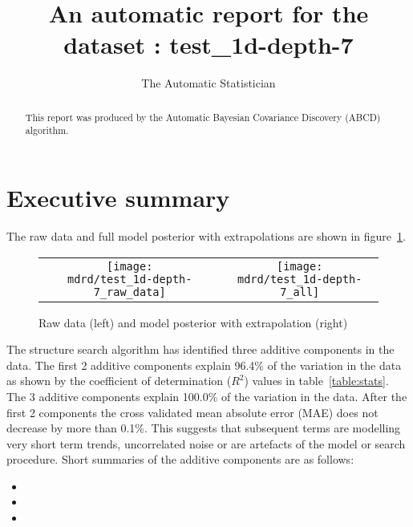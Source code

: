 \documentclass{article} %
\title{An automatic report for the dataset : test_1d-depth-7}
\author{
The Automatic Statistician
}
\begin{document}
\allowdisplaybreaks

\maketitle

\begin{abstract}
This report was produced by the Automatic Bayesian Covariance Discovery (ABCD) algorithm.
\end{abstract}

\section{Executive summary}

The raw data and full model posterior with extrapolations are shown in figure~\ref{fig:rawandfit}.

\begin{figure}[H]
\newcommand{\wmgd}{0.5\columnwidth}
\newcommand{\hmgd}{3.0cm}
\newcommand{\mdrd}{test_1d-depth-7}
\newcommand{\mbm}{\hspace{-0.3cm}}
\begin{tabular}{cc}
\mbm \texttt{[image: \\mdrd/test\_1d-depth-7\_raw\_data]} & \texttt{[image: \\mdrd/test\_1d-depth-7\_all]}
\end{tabular}
\caption{Raw data (left) and model posterior with extrapolation (right)}
\label{fig:rawandfit}
\end{figure}

The structure search algorithm has identified three additive components in the data.
The  first 2 additive components explain 96.4\% of the variation in the data as shown by the coefficient of determination ($R^2$) values in table~\ref{table:stats}.
The 3 additive components explain 100.0\% of the variation in the data.
After the first 2 components the cross validated mean absolute error (MAE) does not decrease by more than 0.1\%.
This suggests that subsequent terms are modelling very short term trends, uncorrelated noise or are artefacts of the model or search procedure.
Short summaries of the additive components are as follows:
\begin{itemize}

  \item  

  \item  

  \item  

\end{itemize}
\end{document}

